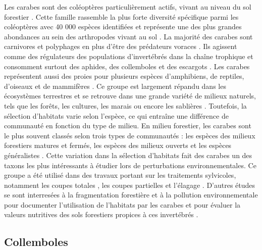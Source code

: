 Les carabes sont des coléoptères particulièrement actifs, vivant au niveau du sol forestier \citep{loveiEcologyBehaviorGround1996,Rochefort2006GroundBeetle}.
Cette famille rassemble la plus forte diversité spécifique parmi les coléoptères avec 40 000 espèces identifiées \citep{Erwin1985taxonpulse} 
et représente une des plus grandes abondances au sein des arthropodes vivant au sol \citep{loveiEcologyBehaviorGround1996,Rochefort2006GroundBeetle}.
La majorité des carabes sont carnivores et polyphages en plus d’être des prédateurs voraces \citep{loveiEcologyBehaviorGround1996}. 
Ils agissent comme des régulateurs des populations d’invertébrés dans la chaîne trophique et consomment surtout des aphides, des collemboles et des escargots \citep{loveiEcologyBehaviorGround1996}. 
Les carabes représentent aussi des proies pour plusieurs espèces d’amphibiens, de reptiles, d’oiseaux et de mammifères \citep{loveiEcologyBehaviorGround1996}. 
Ce groupe est largement répandu dans les écosystèmes terrestres et se retrouve dans une grande variété de milieux naturels, tels que les forêts, les cultures, les marais ou encore les sablières \citep{Larochelle2003naturalhistory}. 
Toutefois, la sélection d'habitats varie selon l'espèce, ce qui entraîne une différence de communauté en fonction du type de milieu.
En milieu forestier, les carabes sont le plus souvent classés selon trois types de communautés : les espèces des milieux forestiers matures et fermés, les espèces des milieux ouverts et les espèces généralistes \citep{Niemela2007effectsforestry}. 
Cette variation dans la sélection d'habitats fait des carabes un des taxons les plus intéressants à étudier lors de perturbations environnementales.
Ce groupe a été utilisé dans des travaux portant sur les traitements sylvicoles, notamment les coupes totales \citep{Niemela1993Effectsclearcut,Heliola2001Distributioncarabid,koivulaBorealCarabidbeetleColeoptera2002a}, 
les coupes partielles et l'élagage \citep{Lemieux2004Groundbeetle,mooreEffectsTwoSilvicultural2004,Peck2004Longertermeffects}.
D'autres études se sont interresées à la fragmentation forestière et à la pollution environnementale pour documenter l'utilisation de l'habitats par les carabes et pour évaluer la valeurs nutritives des sols forestiers propices à ces invertébrés \citep{bouchardBeetleCommunityResponse2016b,Luff1992Classificationprediction,Rainio2003Groundbeetles,Work2008Evaluationcarabid}.

\subsection*{Collemboles}

